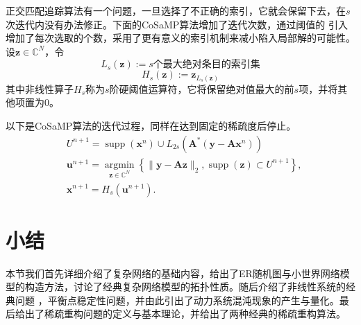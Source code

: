 正交匹配追踪算法有一个问题，一旦选择了不正确的索引，它就会保留下去，在$s$次迭代内没有办法修正。下面的CoSaMP算法增加了迭代次数，通过阈值的
引入增加了每次选取的个数，采用了更有意义的索引机制来减小陷入局部解的可能性。
设$\mathbf{z} \in \mathbb{C}^N$，令
\begin{equation}
    L_s(\mathbf{z}):=s\text{个最大绝对条目的索引集}
\end{equation}
\begin{equation}
    H_s(\mathbf{z}):=\mathbf{z}_{L_s(\mathbf{z})}
\end{equation}
其中非线性算子$H_s$称为$s$阶硬阈值运算符，它将保留绝对值最大的前$s$项，并将其他项置为0。\par
以下是CoSaMP算法的迭代过程，同样在达到固定的稀疏度后停止。
\begin{equation}
    \begin{aligned}
    & U^{n+1}=\operatorname{supp}\left(\mathbf{x}^n\right) \cup L_{2 s}\left(\mathbf{A}^*\left(\mathbf{y}-\mathbf{A} \mathbf{x}^n\right)\right) \\
    & \mathbf{u}^{n+1}=\underset{\mathbf{z} \in \mathbb{C}^N}{\operatorname{argmin}}\left\{\|\mathbf{y}-\mathbf{A} \mathbf{z}\|_2, \operatorname{supp}(\mathbf{z}) \subset U^{n+1}\right\}, \\
    & \mathbf{x}^{n+1}=H_s\left(\mathbf{u}^{n+1}\right) .
    \end{aligned}
\end{equation}
\section{小结}
本节我们首先详细介绍了复杂网络的基础内容，给出了ER随机图与小世界网络模型的构造方法，讨论了经典复杂网络模型的拓扑性质。随后介绍了非线性系统的经典问题
，平衡点稳定性问题，并由此引出了动力系统混沌现象的产生与量化。最后给出了稀疏重构问题的定义与基本理论，并给出了两种经典的稀疏重构算法。
